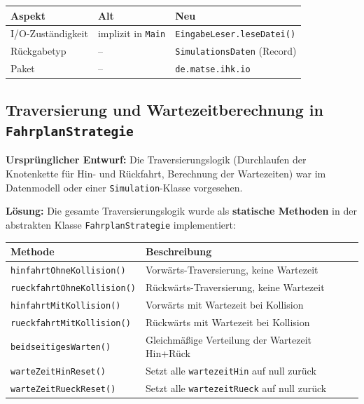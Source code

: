 \documentclass[12pt,a4paper]{article}
\begin{document}
\begin{center}
\begin{tabular}{lll}
\toprule
\textbf{Aspekt}       & \textbf{Alt}              & \textbf{Neu}                     \\
\midrule
I/O-Zuständigkeit     & implizit in \texttt{Main} & \texttt{EingabeLeser.leseDatei()} \\
Rückgabetyp           & --                        & \texttt{SimulationsDaten} (Record) \\
Paket                 & --                        & \texttt{de.matse.ihk.io}          \\
\bottomrule
\end{tabular}
\end{center}

\subsection{Traversierung und Wartezeitberechnung in \texttt{FahrplanStrategie}}

\textbf{Ursprünglicher Entwurf:} Die Traversierungslogik (Durchlaufen der
Knotenkette für Hin- und Rückfahrt, Berechnung der Wartezeiten) war im Datenmodell
oder einer \texttt{Simulation}-Klasse vorgesehen.

\textbf{Lösung:} Die gesamte Traversierungslogik wurde als \textbf{statische Methoden}
in der abstrakten Klasse \texttt{FahrplanStrategie} implementiert:

\begin{center}
\begin{tabular}{ll}
\toprule
\textbf{Methode}                  & \textbf{Beschreibung}                          \\
\midrule
\texttt{hinfahrtOhneKollision()}  & Vorwärts-Traversierung, keine Wartezeit        \\
\texttt{rueckfahrtOhneKollision()} & Rückwärts-Traversierung, keine Wartezeit      \\
\texttt{hinfahrtMitKollision()}   & Vorwärts mit Wartezeit bei Kollision           \\
\texttt{rueckfahrtMitKollision()} & Rückwärts mit Wartezeit bei Kollision          \\
\texttt{beidseitigesWarten()}     & Gleichmäßige Verteilung der Wartezeit Hin+Rück \\
\texttt{warteZeitHinReset()}      & Setzt alle \texttt{wartezeitHin} auf null zurück \\
\texttt{warteZeitRueckReset()}    & Setzt alle \texttt{wartezeitRueck} auf null zurück \\
\bottomrule
\end{tabular}
\end{center}
\end{document}

